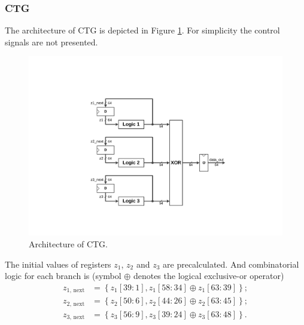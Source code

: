 \documentclass[a4paper, titlepage]{article}
\begin{document}
\subsubsection{CTG}
The architecture of \textsf{CTG} is depicted in Figure \ref{fig:ctgarch}.
For simplicity the control signals are not presented.
\begin{figure}[!htbp]
\centering
\includegraphics[scale=0.7,angle=270]{ctgarch.pdf}
\caption{Architecture of CTG.}
\label{fig:ctgarch}
\end{figure}

The initial values of registers $z_1$, $z_2$ and $z_3$ are precalculated.
And combinatorial logic for each branch is
(symbol $\oplus$ denotes the logical exclusive-or operator)
\begin{align}
    z_{1,\,\text{next}} &= \left\{ z_1[39:1], z_1[58:34] \oplus z_1[63:39] \right\}; \\
    z_{2,\,\text{next}} &= \left\{ z_2[50:6], z_2[44:26] \oplus z_2[63:45] \right\}; \\
    z_{3,\,\text{next}} &= \left\{ z_3[56:9], z_3[39:24] \oplus z_3[63:48] \right\}.
\end{align}
\end{document}
